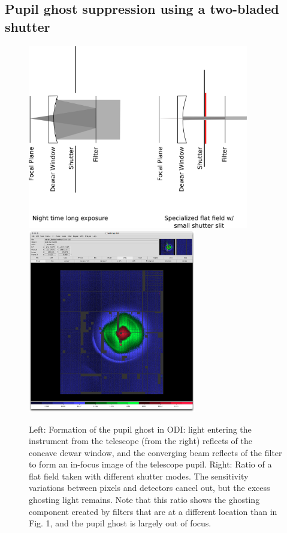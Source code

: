 \documentclass[draft]{spieman}
\begin{document}
\subsection{Pupil ghost suppression using a two-bladed shutter}

\begin{figure}
    \includegraphics[height=8cm]{images/odishutterpupilghostsupression.png}
    \hspace{0.5cm} \includegraphics[height=8cm]{images/odi_layeronepg.png}
    
    \caption{ \label{fig_pupilghost}Left: Formation of the pupil ghost in ODI:  light 
        entering the instrument from the telescope (from the right) reflects of the
        concave dewar window, and the converging beam reflects of the filter to
        form an in-focus image of the telescope pupil. Right: Ratio of a flat
        field taken with different shutter modes. The sensitivity variations between
        pixels and detectors cancel out, but the excess ghosting light remains. Note
        that this ratio shows the ghosting component created by filters that are at
        a different location than in Fig. 1, and the pupil ghost is largely out of
        focus.}
    
\end{figure}
\end{document}
